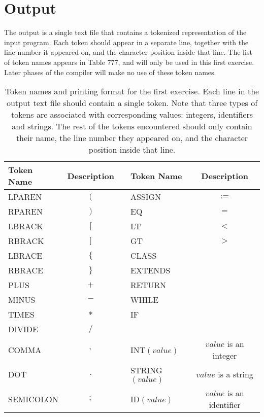 \documentclass{article}
\begin{document}
\section{Output}
The output is a single text file that contains a tokenized representation of the input program.
Each token should appear in a separate line, together with the line number
it appeared on, and the character position inside that line.
The list of token names appears in Table 777,
and will only be used in this first exercise.
Later phases of the compiler will make no use of these token names.
\begin{table}[h]
\centering
\begin{tabular}{|l|c|c|l|c|}
  \hline
  Token Name & Description & & Token Name & Description \\
  \hline
  \hline
  LPAREN    & $($  & & ASSIGN           & $:=$                     \\
  RPAREN    & $)$  & & EQ               & $=$                      \\
  LBRACK    & $[$  & & LT               & $<$                      \\
  RBRACK    & $]$  & & GT               & $>$                      \\
  LBRACE    & $\{$ & & CLASS            &                          \\
  RBRACE    & $\}$ & & EXTENDS          &                          \\
  PLUS      & $+$  & & RETURN           &                          \\
  MINUS     & $-$  & & WHILE            &                          \\
  TIMES     & $*$  & & IF               &                          \\
  DIVIDE    & $/$  & &                  &                          \\
  COMMA     & $,$  & & INT$(value)$     & $value$ is an integer    \\
  DOT       & $.$  & & STRING$(value)$  & $value$ is a string      \\
  SEMICOLON & $;$  & & ID$(value)$      & $value$ is an identifier \\
  \hline
\end{tabular}
\caption{
Token names and printing format for the first exercise.
Each line in the output text file should contain a single token.
Note that three types of tokens are associated with corresponding values:
integers, identifiers and strings. The rest of the tokens encountered
should only contain their name,
the line number they appeared on, and the character position inside that line.
\label{Table_Token_Names_For_Exercise_1}}
\end{table}
\end{document}
